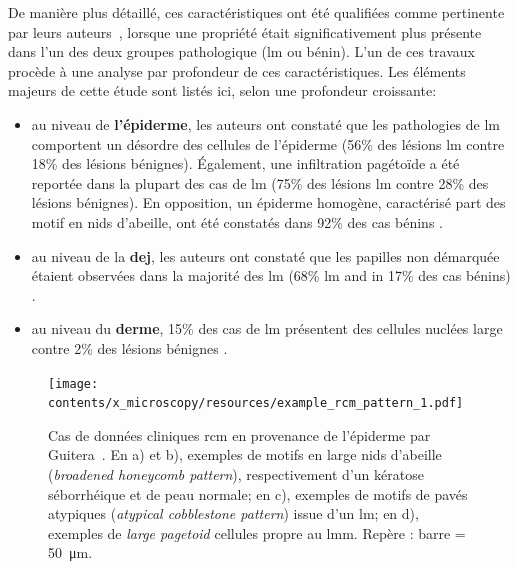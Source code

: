 De manière plus détaillé, ces caractéristiques ont été qualifiées comme pertinente par leurs auteurs~\cite{Pellacani2007, Guitera2010}, lorsque une propriété était significativement plus présente dans l'un des deux groupes pathologique (\gls{lm} ou bénin). L'un de ces travaux~\cite{Guitera2010} procède à une analyse par profondeur de ces caractéristiques. Les éléments majeurs de cette étude sont listés ici, selon une profondeur croissante:
\begin{itemize}
    \item au niveau de \textbf{l'épiderme}, les auteurs ont constaté que les pathologies de \gls{lm} comportent un désordre des cellules de l'épiderme (56\% des lésions \gls{lm} contre 18\% des lésions bénignes). Également, une infiltration pagétoïde a été reportée dans la plupart des cas de \gls{lm}  (75\% des lésions \gls{lm} contre 28\% des lésions bénignes). En opposition, un épiderme homogène, caractérisé part des motif en nids d'abeille, ont été constatés dans 92\% des cas bénins .
    \item au niveau de la \textbf{\gls{dej}}, les auteurs ont constaté que les papilles non démarquée étaient observées dans la majorité des \gls{lm} (68\% \gls{lm} and in 17\% des cas bénins) .
    \item au niveau du \textbf{derme}, 15\% des cas de \gls{lm} présentent des cellules nuclées large contre 2\% des lésions bénignes .
\end{itemize}\par

\begin{figure}[H]
    \begin{center}
        \texttt{[image: contents/x\_microscopy/resources/example\_rcm\_pattern\_1.pdf]}
        \caption{Cas de données cliniques \gls{rcm} en provenance de l'épiderme par Guitera~\cite{Guitera2010}. En a) et b), exemples de motifs en large nids d'abeille (\textit{broadened honeycomb pattern}), respectivement d'un kératose séborrhéique et de peau normale; en c), exemples de motifs de pavés atypiques (\textit{atypical cobblestone pattern}) issue d'un \gls{lm}; en d), exemples de \textit{large pagetoid} cellules propre au \gls{lmm}. Repère : barre = \SI{50}{\micro\metre}.}
        \label{fig:example_rcm_pattern_1}
    \end{center} 
\end{figure}\par

